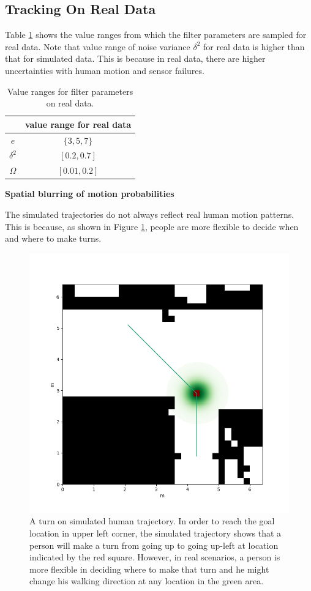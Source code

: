 \subsection{Tracking On Real Data}

Table \ref{table:param_range_real} shows the value ranges from which the filter parameters are sampled for real data. Note that value range of noise variance $\delta^2$ for real data is higher than that for simulated data. This is because in real data, there are higher uncertainties with human motion and sensor failures.

\begin{table}[H]
\centering
  \begin{tabular}{c|c}
    \hline
     &  value range for real data \\ \hline
    \( e \) &  \( \{3, 5, 7\} \)\\
    \(  \delta^2\) & \( [0.2, 0.7]\) \\   
   \( \Omega \) & \( [0.01, 0.2] \)\\
   \hline
 \end{tabular}
\caption{Value ranges for filter parameters on real data.}
\label{table:param_range_real}
\end{table}

\textbf{Spatial blurring of motion probabilities}

The simulated trajectories do not always reflect real human motion patterns. This is because, as shown in Figure \ref{fig:blur_idea}, people are more flexible to decide when and where to make turns. 

\begin{figure}[ht]
  \centering
   \captionsetup{width=\linewidth}
    \includegraphics[width=.6\textwidth]{figures/blur_idea.png}
    \caption[A turn on simulated human trajectory.]{A turn on simulated human trajectory. In order to reach the goal location in upper left corner, the simulated trajectory shows that a person will make a turn from going up to going up-left at location indicated by the red square. However, in real scenarios, a person is more flexible in deciding where to make that turn and he might change his walking direction at any location in the green area.}
    \label{fig:blur_idea}
\end{figure}

